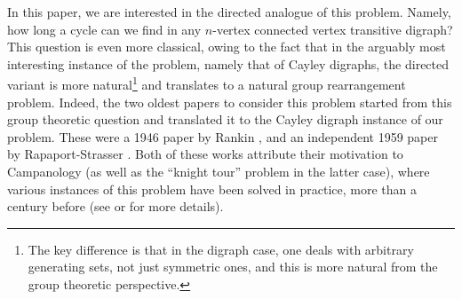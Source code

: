 \documentclass[english,11pt]{article}
\theoremstyle{definition}
\numberwithin{equation}{section}
\numberwithin{figure}{section}
\begin{document}
In this paper, we are interested in the directed analogue of this problem. Namely, how long a cycle can we find in any $n$-vertex connected vertex transitive digraph?  This question is even more classical, owing to the fact that in the arguably most interesting instance of the problem, namely that of Cayley digraphs, the directed variant is more natural\footnote{The key difference is that in the digraph case, one 
deals with arbitrary generating sets, not just symmetric ones, and this is more natural from the group theoretic perspective.} 
and translates to a natural group rearrangement problem. Indeed, the two oldest papers to consider this problem started from this group theoretic question and translated it to the Cayley digraph instance of our problem. These were a 1946 paper by Rankin \cite{rankin}, and an independent 1959 paper by Rapaport-Strasser \cite{RS}. Both of these works attribute their motivation to Campanology (as well as the ``knight tour'' problem in the latter case), where various instances of this problem have been solved in practice, more than a century before (see \cite[Section 4]{rankin} or \cite[Chapter 15]{white1985graphs} for more details).
\end{document}
